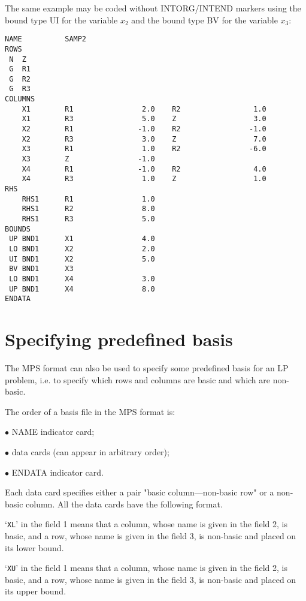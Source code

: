 The same example may be coded without INTORG/INTEND markers using the
bound type UI for the variable $x_2$ and the bound type BV for the
variable $x_3$:

\begin{verbatim}
NAME          SAMP2
ROWS
 N  Z
 G  R1
 G  R2
 G  R3
COLUMNS
    X1        R1                2.0    R2                 1.0
    X1        R3                5.0    Z                  3.0
    X2        R1               -1.0    R2                -1.0
    X2        R3                3.0    Z                  7.0
    X3        R1                1.0    R2                -6.0
    X3        Z                -1.0
    X4        R1               -1.0    R2                 4.0
    X4        R3                1.0    Z                  1.0
RHS
    RHS1      R1                1.0
    RHS1      R2                8.0
    RHS1      R3                5.0
BOUNDS
 UP BND1      X1                4.0
 LO BND1      X2                2.0
 UI BND1      X2                5.0
 BV BND1      X3
 LO BND1      X4                3.0
 UP BND1      X4                8.0
ENDATA
\end{verbatim}

\section{Specifying predefined basis}
\label{secbas}

The MPS format can also be used to specify some predefined basis for an
LP problem, i.e. to specify which rows and columns are basic and which
are non-basic.

The order of a basis file in the MPS format is:

$\bullet$ NAME indicator card;

$\bullet$ data cards (can appear in arbitrary order);

$\bullet$ ENDATA indicator card.

Each data card specifies either a pair "basic column---non-basic row"
or a non-basic column. All the data cards have the following format.

`\verb|XL|' in the field 1 means that a column, whose name is given in
the field 2, is basic, and a row, whose name is given in the field 3,
is non-basic and placed on its lower bound.

`\verb|XU|' in the field 1 means that a column, whose name is given in
the field 2, is basic, and a row, whose name is given in the field 3,
is non-basic and placed on its upper bound.


